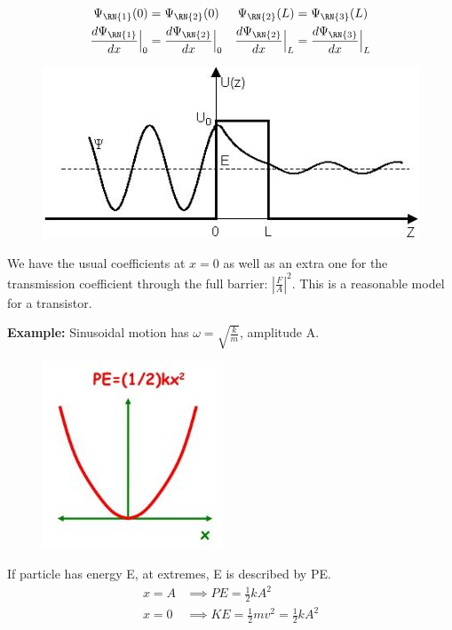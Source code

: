\documentclass[a4paper, 11pt, normalem]{report}
\begin{document}
\begin{align}
    \Psi_{\RN{1}}(0) &= \Psi_{\RN{2}}(0) & \Psi_{\RN{2}}(L) &= \Psi_{\RN{3}}(L) \\
    \frac{d\Psi_{\RN{1}}}{dx}\Big|_{0} &= \frac{d\Psi_{\RN{2}}}{dx}\Big|_{0} & \frac{d\Psi_{\RN{2}}}{dx}\Big|_{L} &= \frac{d\Psi_{\RN{3}}}{dx}\Big|_{L}
\end{align}
\begin{figure}[H]
    \centering
    \includegraphics[scale=0.9]{PotBar.jpg}
\end{figure}
We have the usual coefficients at $x = 0$ as well as an extra one for the transmission coefficient through the full barrier: $|\frac{F}{A}|^{2}$.
This is a reasonable model for a transistor.

\textbf{Example:} Sinusoidal motion has $\omega = \sqrt{\frac{k}{m}}$, amplitude A.
\begin{figure}[H]
    \centering
    \includegraphics{Pote.jpg} 
\end{figure}
If particle has energy E, at extremes, E is described by PE.
\begin{align}
    x = A &\implies PE = \frac{1}{2}kA^{2} \\
    x = 0 &\implies KE = \frac{1}{2}mv^{2} = \frac{1}{2}kA^{2}
\end{align}
\end{document}
